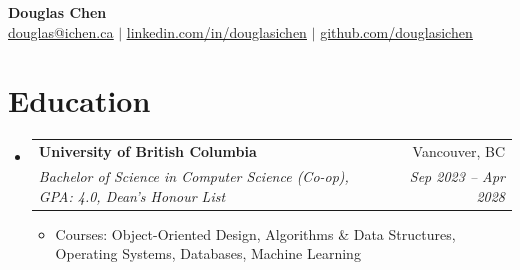 \documentclass[letterpaper,11pt]{article}
\makeatletter
\newcommand{\resumeItem}[1]{
  \item\small{
    \setlength{\baselineskip}{0.0pt}
    {#1\par\vspace{0.5pt}}
  }
}
\newcommand{\resumeSubheading}[4]{
  \vspace{0pt}\item
    \begin{tabular*}{0.97\textwidth}[t]{l@{\extracolsep{\fill}}r}
      \textbf{#1} & #2 \\
      \textit{\small#3} & \textit{\small #4} \\
    \end{tabular*}\vspace{-7pt}
}
\newcommand{\resumeSubHeadingListStart}{\begin{itemize}[leftmargin=0.15in, label={}]}
\newcommand{\resumeSubHeadingListEnd}{\end{itemize}}
\newcommand{\resumeItemListStart}{\begin{itemize}}
\newcommand{\resumeItemListEnd}{\end{itemize}\vspace{-7pt}}
\makeatother
\begin{document}
\begin{center}
    \textbf{\Huge Douglas Chen} \\ \vspace{1pt}
    \href{mailto:douglas@ichen.ca}{\underline{douglas@ichen.ca}} $|$
    \href{https://www.linkedin.com/in/douglasichen/}{\underline{linkedin.com/in/douglasichen}} $|$
    \href{https://www.github.com/douglasichen}{\underline{github.com/douglasichen}}
\end{center}

\section{Education}
  \resumeSubHeadingListStart
    \resumeSubheading
      {University of British Columbia}{Vancouver, BC}
      {Bachelor of Science in Computer Science (Co-op), GPA: 4.0, Dean's Honour List}{Sep 2023 -- Apr 2028}
      \resumeItemListStart
        \resumeItem{Courses: Object-Oriented Design, Algorithms \& Data Structures, Operating Systems, Databases, Machine Learning}
      \resumeItemListEnd
  \resumeSubHeadingListEnd
\end{document}
